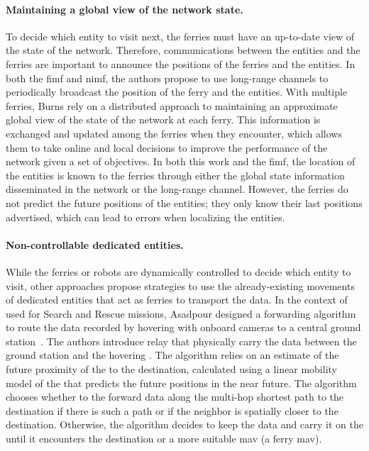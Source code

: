 \paragraph{Maintaining a global view of the network state.}
To decide which entity to visit next, the ferries must have an up-to-date view of the state of the network. Therefore, communications between the entities and the ferries are important to announce the positions of the ferries and the entities. In both the \acrshort{fimf} and \acrshort{nimf}, the authors propose to use long-range channels to periodically broadcast the position of the ferry and the entities. With multiple ferries, Burns \etal rely on a distributed approach to maintaining an approximate global view of the state of the network at each ferry. This information is exchanged and updated among the ferries when they encounter, which allows them to take online and local decisions to improve the performance of the network given a set of objectives. In both this work and the \acrshort{fimf}, the location of the entities is known to the ferries through either the global state information disseminated in the network or the long-range channel. However, the ferries do not predict the future positions of the entities; they only know their last positions advertised, which can lead to errors when localizing the entities.

\paragraph{Non-controllable dedicated entities.}
While the ferries or robots are dynamically controlled to decide which entity to visit, other approaches propose strategies to use the already-existing movements of dedicated entities that act as ferries to transport the data. In the context of  used for Search and Rescue missions, Asadpour \etal designed a forwarding algorithm to route the data recorded by hovering  with onboard cameras to a central ground station~\cite{asadpour2016route,asadpour2013now,asadpour2014micro}. The authors introduce relay  that physically carry the data between the ground station and the hovering . The algorithm relies on an estimate of the future proximity of the  to the destination, calculated using a linear mobility model of the  that predicts the future positions in the near future. The algorithm chooses whether to the forward data along the multi-hop shortest path to the destination if there is such a path or if the neighbor is spatially closer to the destination. Otherwise, the algorithm decides to keep the data and carry it on the  until it encounters the destination or a more suitable \acrshort{mav} (\eg a ferry \acrshort{mav}).

